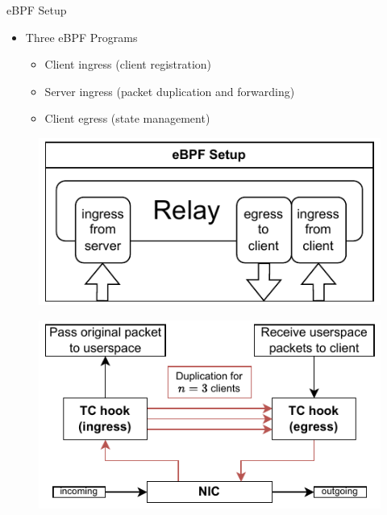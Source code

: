 \documentclass[shortpres,aspectratio=43]{beamer}
\newlength{\mylength}
\begin{document}

\begin{frame}{eBPF Setup}
    \begin{minipage}{0.43\textwidth}
        \begin{itemize}
            \item Three eBPF Programs
            \vspace{2\mylength}
            \begin{itemize}
                \item Client ingress (client registration)
                \vspace{2\mylength}
                \item Server ingress (packet duplication and forwarding)
                \vspace{2\mylength}
                \item Client egress (state management)
            \end{itemize}
        \end{itemize}
    \end{minipage}\hfill
    \begin{minipage}{0.55\textwidth}
        \centering
        \begin{figure}
            \includegraphics[scale=0.6]{../figures/03_fast_relays/ebpf-setup.drawio.pdf}
        \end{figure}
        \vspace{2\mylength}
        \begin{figure}
            \includegraphics[scale=0.7]{../figures/03_fast_relays/packet-forwarding.drawio.pdf}
        \end{figure}
    \end{minipage}
\end{frame}
\end{document}
